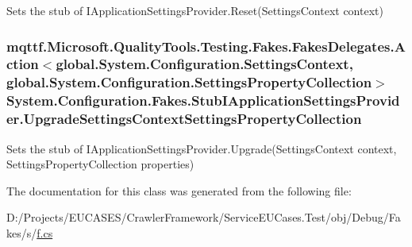 Sets the stub of I\-Application\-Settings\-Provider.\-Reset(\-Settings\-Context context)

\hypertarget{class_system_1_1_configuration_1_1_fakes_1_1_stub_i_application_settings_provider_ac103e4052676e95928b22cf893ad3f9c}{
\subsubsection[{Upgrade\-Settings\-Context\-Settings\-Property\-Collection}]{\setlength{\rightskip}{0pt plus 5cm}mqttf.\-Microsoft.\-Quality\-Tools.\-Testing.\-Fakes.\-Fakes\-Delegates.\-Action$<$global.\-System.\-Configuration.\-Settings\-Context, global.\-System.\-Configuration.\-Settings\-Property\-Collection$>$ System.\-Configuration.\-Fakes.\-Stub\-I\-Application\-Settings\-Provider.\-Upgrade\-Settings\-Context\-Settings\-Property\-Collection}}\label{class_system_1_1_configuration_1_1_fakes_1_1_stub_i_application_settings_provider_ac103e4052676e95928b22cf893ad3f9c}


Sets the stub of I\-Application\-Settings\-Provider.\-Upgrade(\-Settings\-Context context, Settings\-Property\-Collection properties)



The documentation for this class was generated from the following file\-:\begin{DoxyCompactItemize}
\item 
D\-:/\-Projects/\-E\-U\-C\-A\-S\-E\-S/\-Crawler\-Framework/\-Service\-E\-U\-Cases.\-Test/obj/\-Debug/\-Fakes/s/\hyperlink{s_2f_8cs}{f.\-cs}\end{DoxyCompactItemize}
